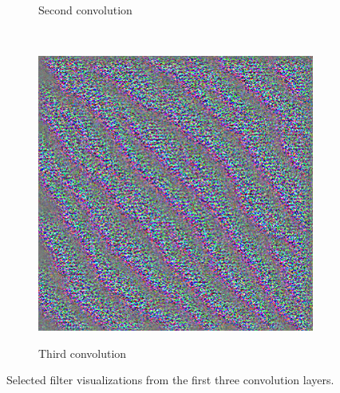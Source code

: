 \documentclass{kththesis}
\begin{document}
\begin{figure}[H]
\begin{subfigure}{.5\textwidth}
    \label{fig:layer1}
    \caption{Second convolution}
  \end{subfigure}
  \\[10pt]
  \begin{subfigure}{1\textwidth}
    \centering
    \includegraphics[width=0.45\linewidth]{img/layer2.png}
    \label{fig:layer2}
    \caption{Third convolution}
  \end{subfigure}
  \label{fig:filtervis}
  \caption{Selected filter visualizations from the first three convolution layers.}
\end{figure}
\end{document}
